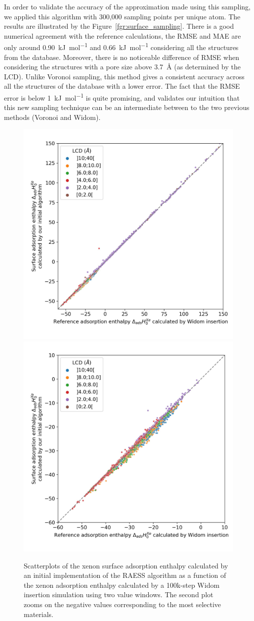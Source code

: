 \documentclass[main]{subfiles}
\begin{document}
In order to validate the accuracy of the approximation made using this sampling, we applied this algorithm with 300,000 sampling points per unique atom. The results are illustrated by the Figure~\ref{fgr:surface_sampling}. There is a good numerical agreement with the reference calculations, {the RMSE and MAE are only around \SI{0.90}{\kilo\joule\per\mole} and \SI{0.66}{\kilo\joule\per\mole}} considering all the structures from the database. Moreover, there is no noticeable difference of RMSE when considering the structures with a pore size above \SI{3.7}{\angstrom} (as determined by the LCD). Unlike Voronoi sampling, this method gives a consistent accuracy across all the structures of the database with a lower error. The fact that the {RMSE} error is below \SI{1}{\kilo\joule\per\mole} is quite promising, and validates our intuition that this new sampling technique can be an intermediate between to the two previous methods (Voronoi and Widom).

\begin{figure}[ht]
  \centering
  \includegraphics[width=0.48\linewidth]{figures/3-fastsim/H_Xe_widom_vs_H_Xe_surface_spiral_overview.jpg}
  \includegraphics[width=0.48\linewidth]{figures/3-fastsim/H_Xe_widom_vs_H_Xe_surface_spiral_zoom.jpg}
    \caption{Scatterplots of the xenon surface adsorption enthalpy calculated by an initial implementation of the RAESS algorithm as a function of the xenon adsorption enthalpy calculated by a 100k-step Widom insertion simulation using two value windows. The second plot zooms on the negative values corresponding to the most selective materials.}\label{fgr:surface_sampling_init}
\end{figure}
\end{document}
